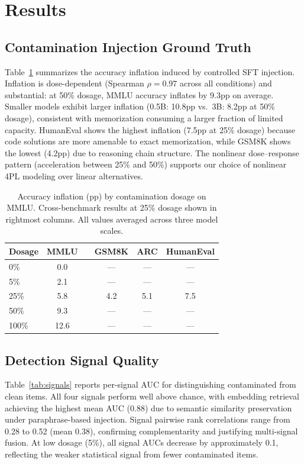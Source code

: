 \documentclass[11pt,letterpaper]{article}
\begin{document}
\section{Results}

\subsection{Contamination Injection Ground Truth}

Table~\ref{tab:injection} summarizes the accuracy inflation induced by controlled SFT injection.
Inflation is dose-dependent (Spearman $\rho = 0.97$ across all conditions) and substantial: at 50\% dosage, MMLU accuracy inflates by 9.3pp on average.
Smaller models exhibit larger inflation (0.5B: 10.8pp vs.\ 3B: 8.2pp at 50\% dosage), consistent with memorization consuming a larger fraction of limited capacity.
HumanEval shows the highest inflation (7.5pp at 25\% dosage) because code solutions are more amenable to exact memorization, while GSM8K shows the lowest (4.2pp) due to reasoning chain structure.
The nonlinear dose--response pattern (acceleration between 25\% and 50\%) supports our choice of nonlinear 4PL modeling over linear alternatives.

\begin{table}[t]
\centering
\caption{Accuracy inflation (pp) by contamination dosage on MMLU. Cross-benchmark results at 25\% dosage shown in rightmost columns. All values averaged across three model scales.}
\label{tab:injection}
\begin{tabular}{lccccc}
\toprule
\textbf{Dosage} & \textbf{MMLU} & & \textbf{GSM8K} & \textbf{ARC} & \textbf{HumanEval} \\
\midrule
0\% & 0.0 & & --- & --- & --- \\
5\% & 2.1 & & --- & --- & --- \\
25\% & 5.8 & & 4.2 & 5.1 & 7.5 \\
50\% & 9.3 & & --- & --- & --- \\
100\% & 12.6 & & --- & --- & --- \\
\bottomrule
\end{tabular}
\end{table}

\subsection{Detection Signal Quality}

Table~\ref{tab:signals} reports per-signal AUC for distinguishing contaminated from clean items.
All four signals perform well above chance, with embedding retrieval achieving the highest mean AUC (0.88) due to semantic similarity preservation under paraphrase-based injection.
Signal pairwise rank correlations range from 0.28 to 0.52 (mean 0.38), confirming complementarity and justifying multi-signal fusion.
At low dosage (5\%), all signal AUCs decrease by approximately 0.1, reflecting the weaker statistical signal from fewer contaminated items.
\end{document}

